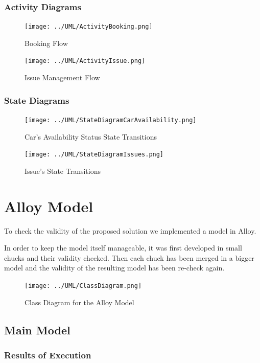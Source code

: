 \documentclass[11pt]{article} %
\begin{document}
\subsubsection{Activity Diagrams}
\begin{figure}[H]
	\centering
	\texttt{[image: ../UML/ActivityBooking.png]}
	\caption{Booking Flow}
\end{figure}

\begin{figure}[H]
	\centering
	\texttt{[image: ../UML/ActivityIssue.png]}
	\caption{Issue Management Flow}
\end{figure}
\newpage


\subsubsection{State Diagrams}
\begin{figure}[H]
	\centering
	\texttt{[image: ../UML/StateDiagramCarAvailability.png]}
	\caption{Car's Availability Status State Transitions}
\end{figure}
\begin{figure}[H]
	\centering
	\texttt{[image: ../UML/StateDiagramIssues.png]}
	\caption{Issue's State Transitions}
\end{figure}



\newpage
\section{Alloy Model}

To check the validity of the proposed solution we implemented a model in Alloy.

In order to keep the model itself manageable, it was first developed in small chucks and their validity checked. Then each chuck has been merged in a bigger model and the validity of the resulting model has been re-check again.

\begin{figure}[H]
	\centering
	\texttt{[image: ../UML/ClassDiagram.png]}
	\caption{Class Diagram for the Alloy Model}
\end{figure}

\subsection{Main Model}



\subsubsection{Results of Execution}
\end{document}
